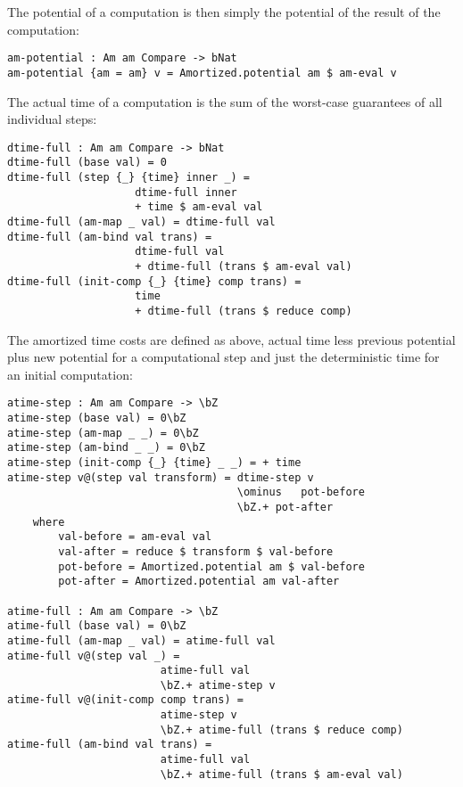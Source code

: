 The potential of a computation is then simply the potential of the result of the computation:

\begin{lstlisting}[caption={Potential of a computation},label={lst:amortized:framework:pot},emph={am,potential}]
am-potential : Am am Compare -> bNat
am-potential {am = am} v = Amortized.potential am $ am-eval v
\end{lstlisting}

The actual time of a computation is the sum of the worst-case guarantees of all individual steps:

\begin{lstlisting}[caption={Actual Time},label={lst:amortized:framework:actualtime},emph={dtime,full}]
dtime-full : Am am Compare -> bNat
dtime-full (base val) = 0
dtime-full (step {_} {time} inner _) =
                    dtime-full inner
                    + time $ am-eval val
dtime-full (am-map _ val) = dtime-full val
dtime-full (am-bind val trans) =
                    dtime-full val
                    + dtime-full (trans $ am-eval val)
dtime-full (init-comp {_} {time} comp trans) =
                    time
                    + dtime-full (trans $ reduce comp)
\end{lstlisting}

The amortized time costs are defined as above, actual time less previous potential plus new potential for a computational step and just the deterministic time for an initial computation:
\begin{lstlisting}[caption={Amortized Time},label={lst:amortized:framework:amortizedtime},emph={dtime,atime,step,full}]
atime-step : Am am Compare -> \bZ
atime-step (base val) = 0\bZ
atime-step (am-map _ _) = 0\bZ
atime-step (am-bind _ _) = 0\bZ
atime-step (init-comp {_} {time} _ _) = + time
atime-step v@(step val transform) = dtime-step v
                                    \ominus   pot-before
                                    \bZ.+ pot-after
    where
        val-before = am-eval val
        val-after = reduce $ transform $ val-before
        pot-before = Amortized.potential am $ val-before
        pot-after = Amortized.potential am val-after

atime-full : Am am Compare -> \bZ
atime-full (base val) = 0\bZ
atime-full (am-map _ val) = atime-full val
atime-full v@(step val _) =
                        atime-full val
                        \bZ.+ atime-step v
atime-full v@(init-comp comp trans) =
                        atime-step v
                        \bZ.+ atime-full (trans $ reduce comp)
atime-full (am-bind val trans) =
                        atime-full val
                        \bZ.+ atime-full (trans $ am-eval val)
\end{lstlisting}

